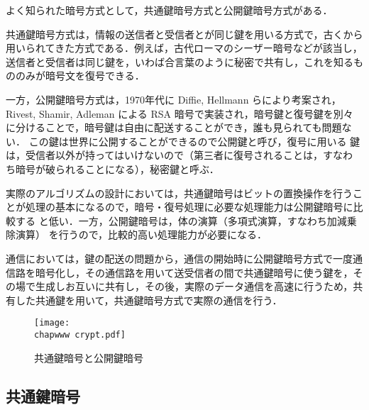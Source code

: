 よく知られた暗号方式として，共通鍵暗号方式と公開鍵暗号方式がある．

共通鍵暗号方式は，情報の送信者と受信者とが同じ鍵を用いる方式で，古くから
用いられてきた方式である．例えば，古代ローマのシーザー暗号などが該当し，
送信者と受信者は同じ鍵を，いわば合言葉のように秘密で共有し，これを知るも
ののみが暗号文を復号できる．

一方，公開鍵暗号方式は，1970年代に Diffie, Hellmann らにより考案され，
Rivest, Shamir, Adleman による RSA 暗号で実装され，暗号鍵と復号鍵を別々
に分けることで，暗号鍵は自由に配送することができ，誰も見られても問題ない．
この鍵は世界に公開することができるので公開鍵と呼び，復号に用いる
鍵は，受信者以外が持ってはいけないので（第三者に復号されることは，すなわ
ち暗号が破られることになる），秘密鍵と呼ぶ．

実際のアルゴリズムの設計においては，共通鍵暗号はビットの置換操作を行うこ
とが処理の基本になるので，暗号・復号処理に必要な処理能力は公開鍵暗号に比較する
と低い．一方，公開鍵暗号は，体の演算（多項式演算，すなわち加減乗除演算）
を行うので，比較的高い処理能力が必要になる．

通信においては，鍵の配送の問題から，通信の開始時に公開鍵暗号方式で一度通
信路を暗号化し，その通信路を用いて送受信者の間で共通鍵暗号に使う鍵を，そ
の場で生成しお互いに共有し，その後，実際のデータ通信を高速に行うため，共
有した共通鍵を用いて，共通鍵暗号方式で実際の通信を行う．

\begin{figure}[ht]
 \begin{center}
  \texttt{[image: \\chapwww crypt.pdf]}
  \label{fig:04:crypt}
  \caption{共通鍵暗号と公開鍵暗号}
 \end{center}
\end{figure}

\subsection{共通鍵暗号}


